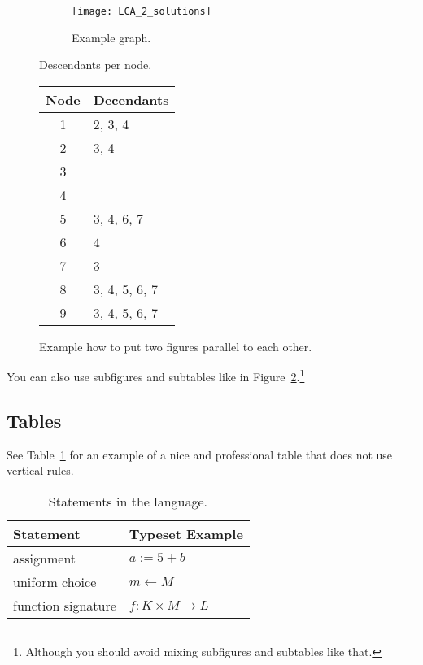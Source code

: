 \begin{figure}
    \centering
    \begin{subfigure}[c]{0.45\textwidth}
        \texttt{[image: LCA\_2\_solutions]}
        \caption{Example graph.}
        \label{fig:graph}
    \end{subfigure}
    \hfil %
    \begin{subtable}[c]{0.3\textwidth}
        \centering
        \caption{Descendants per node.}
        \begin{tabular}{cl}
            \toprule
            Node & Decendants \\
            \midrule
            1 & 2, 3, 4 \\
            2 & 3, 4 \\
            3 & \\
            4 & \\
            5 & 3, 4, 6, 7 \\
            6 & 4 \\
            7 & 3 \\
            8 & 3, 4, 5, 6, 7\\
            9 & 3, 4, 5, 6, 7\\
            \bottomrule
        \end{tabular}
    \end{subtable}
    \caption{Example how to put two figures parallel to each other.}
    \label{fig:LCA_2_solutions}
\end{figure}

You can also use subfigures and subtables like in Figure~\ref{fig:LCA_2_solutions}.\footnote{Although you should avoid mixing subfigures and subtables like that.}


\subsection{Tables}

See Table~\ref{tab:statements} for an example of a nice and professional table that does not use vertical rules.

\begin{table}
    \centering
    \caption{Statements in the \proveit language.}
    \label{tab:statements}
    \begin{tabular}{ll}
        \toprule
        Statement & Typeset Example \\
        \midrule
        assignment & $a := 5 + b$ \\
        uniform choice & $m \gets M$ \\
        function signature & $f : K \times M \to L$ \\
        \bottomrule
    \end{tabular}
\end{table}


